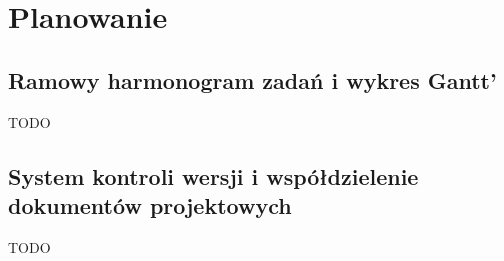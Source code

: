 
\chapter{Planowanie}
\label{ch:planowanie}



\section{Ramowy harmonogram zadań i wykres Gantt’}
\label{sec:ramowy-harmonogram-zadan-i-wykres-gantt’}

TODO

\section{System kontroli wersji i współdzielenie dokumentów projektowych}
\label{sec:-system-kontroli-wersji-i-wspoldzielenie-dokumentow-projektowych}

TODO
